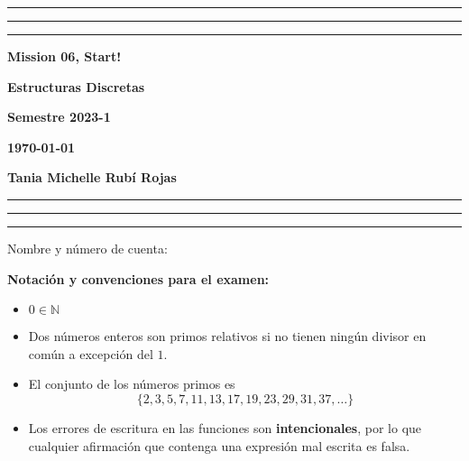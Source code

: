 \documentclass[12pt, a4paper]{exam}
\begin{document}
    \centering
    \hrule \hrule \hrule 
    \vspace{5mm}
    \begin{minipage}[c]{0.8\textwidth}
        \begin{center}
            {\large\textbf{Mission 06, Start!} \par
            \large \textbf{Estructuras Discretas} \par
            \large \textbf{Semestre 2023-1} \par
            \large \textbf{\today}	\par}
        \end{center}
    \end{minipage}

    \vspace{0.2in}
    \noindent
    \textbf{Tania Michelle Rubí Rojas}
    \vspace{2mm}
    \hrule \hrule \hrule 

    \vspace{5mm}
    \noindent
    Nombre y número de cuenta: \hrulefill\

    \vspace{5mm}
    \noindent
    
    \textbf{Notación y convenciones para el examen:}
    {\tiny
    \begin{multicols}{2}
    \begin{itemize}\setlength\itemsep{0em}  
      \item $0\in\mathbb{N}$

      \item Dos números enteros son primos relativos  si no tienen ningún 
      divisor en común a excepción del $1$.

      \item El conjunto de los números primos es
      \begin{equation*}
        \{2,3,5,7,11,13,17,19,23,29, 31, 37, \ldots\}
      \end{equation*}

      \item Los errores de escritura en las funciones son {\bf intencionales}, 
      por lo que cualquier afirmación que contenga una expresión mal escrita 
      es falsa.
    \end{itemize}
    \end{multicols}
    }
\end{document}
